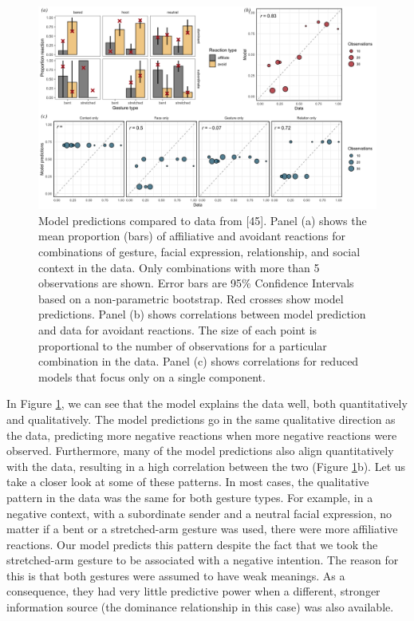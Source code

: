 \documentclass[
  english,
  man,floatsintext]{apa6}
\begin{document}
\begin{figure}

{\centering \includegraphics[width=1\linewidth]{../graphs/Fig1} 

}

\caption{Model predictions compared to data from {[}45{]}. Panel (a) shows the mean proportion (bars) of affiliative and avoidant reactions for combinations of gesture, facial expression, relationship, and social context in the data. Only combinations with more than 5 observations are shown. Error bars are 95\% Confidence Intervals based on a non-parametric bootstrap. Red crosses show model predictions. Panel (b) shows correlations between model prediction and data for avoidant reactions. The size of each point is proportional to the number of observations for a particular combination in the data. Panel (c) shows correlations for reduced models that focus only on a single component.}\label{fig:fig1}
\end{figure}

In Figure \ref{fig:fig1}, we can see that the model explains the data well, both quantitatively and qualitatively. The model predictions go in the same qualitative direction as the data, predicting more negative reactions when more negative reactions were observed. Furthermore, many of the model predictions also align quantitatively with the data, resulting in a high correlation between the two (Figure \ref{fig:fig1}b). Let us take a closer look at some of these patterns. In most cases, the qualitative pattern in the data was the same for both gesture types. For example, in a negative context, with a subordinate sender and a neutral facial expression, no matter if a bent or a stretched-arm gesture was used, there were more affiliative reactions. Our model predicts this pattern despite the fact that we took the stretched-arm gesture to be associated with a negative intention. The reason for this is that both gestures were assumed to have weak meanings. As a consequence, they had very little predictive power when a different, stronger information source (the dominance relationship in this case) was also available.
\end{document}
